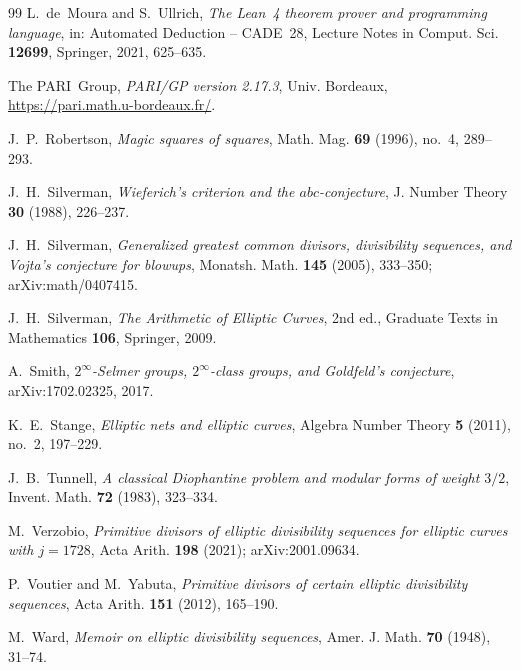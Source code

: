 \documentclass[11pt]{amsart}
\theoremstyle{definition}
\theoremstyle{remark}
\begin{document}
\begin{thebibliography}{99}
 L.~de~Moura and S.~Ullrich, \emph{The Lean~4 theorem prover and programming language}, in:
Automated Deduction -- CADE~28, Lecture Notes in Comput. Sci. \textbf{12699}, Springer, 2021, 625--635.

 The PARI~Group, \emph{PARI/GP version 2.17.3}, Univ. Bordeaux,
\url{https://pari.math.u-bordeaux.fr/}.

 J.~P.~Robertson, \emph{Magic squares of squares}, Math. Mag. \textbf{69} (1996),
no.~4, 289--293.

 J.~H.~Silverman, \emph{Wieferich's criterion and the $abc$-conjecture}, J. Number Theory
\textbf{30} (1988), 226--237.

 J.~H.~Silverman, \emph{Generalized greatest common divisors, divisibility sequences, and
Vojta's conjecture for blowups}, Monatsh. Math. \textbf{145} (2005), 333--350; arXiv:math/0407415.

 J.~H.~Silverman, \emph{The Arithmetic of Elliptic Curves}, 2nd ed., Graduate Texts in
Mathematics \textbf{106}, Springer, 2009.

 A.~Smith, \emph{$2^\infty$-Selmer groups, $2^\infty$-class groups, and Goldfeld's
conjecture}, arXiv:1702.02325, 2017.

 K.~E.~Stange, \emph{Elliptic nets and elliptic curves}, Algebra Number Theory \textbf{5}
(2011), no.~2, 197--229.

 J.~B.~Tunnell, \emph{A classical Diophantine problem and modular forms of weight $3/2$},
Invent. Math. \textbf{72} (1983), 323--334.

 M.~Verzobio, \emph{Primitive divisors of elliptic divisibility sequences for elliptic curves
with $j=1728$}, Acta Arith. \textbf{198} (2021); arXiv:2001.09634.

 P.~Voutier and M.~Yabuta, \emph{Primitive divisors of certain elliptic divisibility
sequences}, Acta Arith. \textbf{151} (2012), 165--190.

 M.~Ward, \emph{Memoir on elliptic divisibility sequences}, Amer. J. Math. \textbf{70}
(1948), 31--74.

\end{thebibliography}
\end{document}
